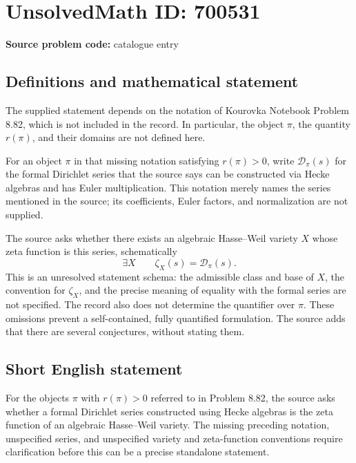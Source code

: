 \documentclass[11pt]{article}
\begin{document}
\section*{UnsolvedMath ID: 700531}
\textbf{Source problem code:} catalogue entry
\subsection{Definitions and mathematical statement}
The supplied statement depends on the notation of Kourovka Notebook Problem 8.82, which is not included in the record. In particular, the object \(\pi\), the quantity \(r(\pi)\), and their domains are not defined here.

For an object \(\pi\) in that missing notation satisfying \(r(\pi)>0\), write \(\mathcal D_{\pi}(s)\) for the formal Dirichlet series that the source says can be constructed via Hecke algebras and has Euler multiplication. This notation merely names the series mentioned in the source; its coefficients, Euler factors, and normalization are not supplied.

The source asks whether there exists an algebraic Hasse--Weil variety \(X\) whose zeta function is this series, schematically
\[
\exists X\qquad \zeta_X(s)=\mathcal D_{\pi}(s).
\]
This is an unresolved statement schema: the admissible class and base of \(X\), the convention for \(\zeta_X\), and the precise meaning of equality with the formal series are not specified. The record also does not determine the quantifier over \(\pi\). These omissions prevent a self-contained, fully quantified formulation. The source adds that there are several conjectures, without stating them.
\subsection{Short English statement}
For the objects \(\pi\) with \(r(\pi)>0\) referred to in Problem 8.82, the source asks whether a formal Dirichlet series constructed using Hecke algebras is the zeta function of an algebraic Hasse--Weil variety. The missing preceding notation, unspecified series, and unspecified variety and zeta-function conventions require clarification before this can be a precise standalone statement.
\end{document}
